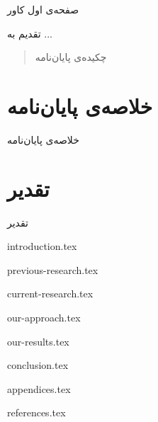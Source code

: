 \documentclass{article}[a4paper, 11px]
\newcommand*{\chapters}{./chapters/}
\begin{document}
صفحه‌ی اول کاور

\newpage


تقدیم به ...

\newpage


\begin{abstract}
چکیده‌ی پایان‌نامه
\end{abstract}
\newpage

\section*{
خلاصه‌ی پایان‌نامه
}

خلاصه‌ی پایان‌نامه
\newpage

\section*{
تقدیر
}

تقدیر
\newpage


\tableofcontents

\newpage


\listoffigures

\newpage
 
 
\listoftables

\newpage

{introduction.tex}


{previous-research.tex}


{current-research.tex}


{our-approach.tex}



{our-results.tex}



{conclusion.tex}



{appendices.tex}




{references.tex}
\end{document}
